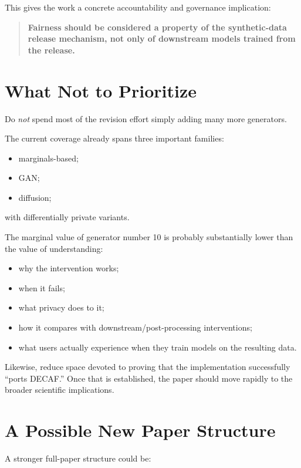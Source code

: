 \documentclass[11pt]{article}
\begin{document}
This gives the work a concrete accountability and governance implication:

\begin{quote}
\textbf{Fairness should be considered a property of the synthetic-data release mechanism, not only of downstream models trained from the release.}
\end{quote}

\section*{What Not to Prioritize}

Do \emph{not} spend most of the revision effort simply adding many more generators.

The current coverage already spans three important families:

\begin{itemize}
    \item marginals-based;
    \item GAN;
    \item diffusion;
\end{itemize}

with differentially private variants.

The marginal value of generator number 10 is probably substantially lower than the value of understanding:

\begin{itemize}
    \item why the intervention works;
    \item when it fails;
    \item what privacy does to it;
    \item how it compares with downstream/post-processing interventions;
    \item what users actually experience when they train models on the resulting data.
\end{itemize}

Likewise, reduce space devoted to proving that the implementation successfully ``ports DECAF.'' Once that is established, the paper should move rapidly to the broader scientific implications.

\section*{A Possible New Paper Structure}

A stronger full-paper structure could be:
\end{document}
